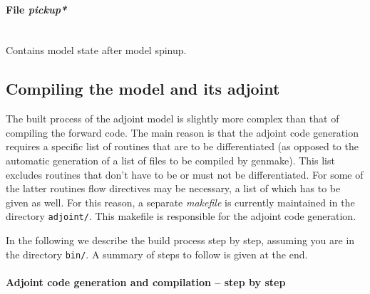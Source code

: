 \paragraph{File {\it pickup*}} ~ \\
%
Contains model state after model spinup.

\subsection{Compiling the model and its adjoint}

The built process of the adjoint model is slightly more
complex than that of compiling the forward code.
The main reason is that the adjoint code generation requires
a specific list of routines that are to be differentiated
(as opposed to the automatic generation of a list of
files to be compiled by genmake).
This list excludes routines that don't have to be or must not be
differentiated. For some of the latter routines flow directives
may be necessary, a list of which has to be given as well.
For this reason, a separate {\it makefile} is currently 
maintained in the directory {\tt adjoint/}. This
makefile is responsible for the adjoint code generation.

In the following we describe the build process step by step,
assuming you are in the directory {\tt bin/}.
A summary of steps to follow is given at the end.

\paragraph{Adjoint code generation and compilation -- step by step}

